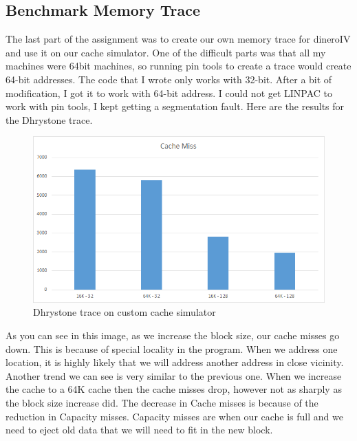\documentclass{article}
\begin{document}
    \subsection{Benchmark Memory Trace}
        The last part of the assignment was to create our own memory trace for dineroIV and use it on our cache simulator. One of the difficult parts was that all my machines were 64bit machines, so running pin tools to create a trace would create 64-bit addresses. The code that I wrote only works with 32-bit. After a bit of modification, I got it to work with 64-bit address. I could not get LINPAC to work with pin tools, I kept getting a segmentation fault. Here are the results for the Dhrystone trace.
        \begin{figure}[H]
            \label{fig:custom_dry}
            \begin{center}
                \includegraphics[width=\textwidth]{custom_dry.png}
                \caption{Dhrystone trace on custom cache simulator}
            \end{center}
        \end{figure}
        As you can see in this image, as we increase the block size, our cache misses go down. This is because of special locality in the program. When we address one location, it is highly likely that we will address another address in close vicinity. Another trend we can see is very similar to the previous one. When we increase the cache to a 64K cache then the cache misses drop, however not as sharply as the block size increase did. The decrease in Cache misses is because of the reduction in Capacity misses. Capacity misses are when our cache is full and we need to eject old data that we will need to fit in the new block.
\end{document}
